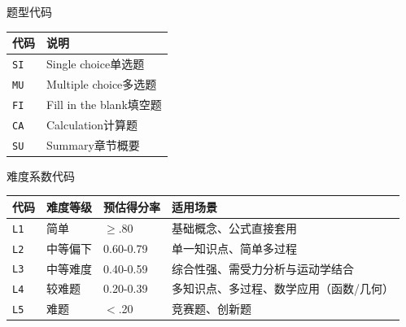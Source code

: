 题型代码

\begin{tabular}{ll}
    \hline
    代码 & 说明 \\
    \hline
    \verb|SI| & Single choice单选题\\
    \verb|MU| & Multiple choice多选题\\
    \verb|FI| & Fill in the blank填空题\\
    \verb|CA| & Calculation计算题\\
    \verb|SU| &Summary章节概要\\
    \hline
\end{tabular}

难度系数代码

\begin{tabular}{llll}
    \hline
    代码 & 难度等级 & 预估得分率 & 适用场景\\
    \hline
    \verb|L1| & 简单 & \(\ge\).80 & 基础概念、公式直接套用\\
    \verb|L2| & 中等偏下 & 0.60-0.79 & 单一知识点、简单多过程\\
    \verb|L3| & 中等难度 & 0.40-0.59 & 综合性强、需受力分析与运动学结合\\
    \verb|L4| & 较难题 & 0.20-0.39 & 多知识点、多过程、数学应用（函数/几何）\\
    \verb|L5| & 难题 & \(<\).20 & 竞赛题、创新题\\
    \hline
\end{tabular}
